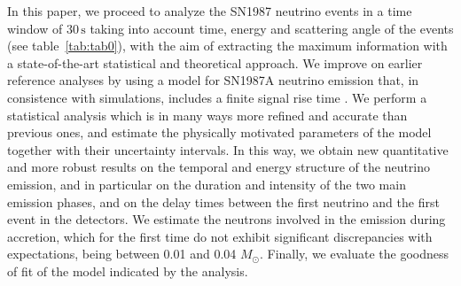\documentclass[a4paper,11pt]{article}
\begin{document}
In this paper, we proceed to analyze the SN1987 neutrino events in a time window of $30\,\mbox{s}$ taking into account time, energy and scattering angle of the events (see table~\ref{tab:tab0}), with the aim of extracting the maximum information with
a state-of-the-art statistical and theoretical approach.
We improve on earlier reference analyses
\cite{Abbott:1987bm, Loredo:2001rx,Pagliaroli:2008ur,DedinNeto:2023hhp} by using a model for SN1987A neutrino emission  that, in consistence with simulations, includes a finite signal rise time \cite{sym13101851}. 
We perform a statistical analysis which is in many ways   more refined and accurate than previous ones, 
and estimate the physically motivated parameters of the model together with their uncertainty intervals. 
In this way, we obtain new quantitative and more robust results on the temporal and energy structure of the neutrino emission, and in particular on the duration and intensity of the two main emission phases, and 
on the delay times between the first neutrino and the first event in the detectors.
We  estimate the neutrons involved in the emission during accretion, which for the first time 
do not exhibit significant discrepancies with expectations, 
being between 0.01 and 0.04 $M_\odot$.
Finally, we evaluate the goodness of fit of the model indicated by the analysis.

\end{document}
